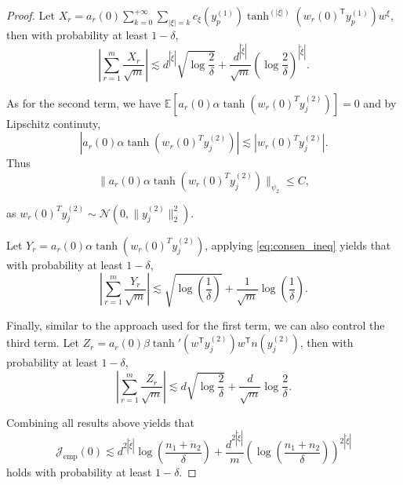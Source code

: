 \documentclass[10pt,a4paper]{amsart}
\newcommand{\T}{\mathsf{T}}
\begin{document}
\begin{proof}
   Let $X_r=a_r(0)\sum_{k=0}^{+\infty} \sum_{|\xi|=k} c_{\xi}(y_p^{(1)}) \tanh^{(|\xi|)}(w_r(0)^\T y_p^{(1)})w^{\xi}$, then with probability at least $1-\delta$,
	\begin{equation*}
        \left|\sum\limits_{r=1}^m \frac{X_r}{\sqrt{m}}\right|\lesssim d^{|\tilde{\xi}|}\sqrt{\log\frac{2}{\delta}} + \frac{d^{|\tilde{\xi}|}}{\sqrt{m}}\left(\log\frac{2}{\delta}\right)^{|\tilde{\xi}|}. 
    \end{equation*}

    As for the second term, we have
     $\mathbb{E}[a_r(0)\alpha\tanh(w_r(0)^T y_j^{(2)})]=0$ and by Lipschitz continuty,
	\begin{equation*}
          |a_r(0)\alpha\tanh(w_r(0)^T y_j^{(2)})|\lesssim |w_r(0)^T y_j^{(2)}|.
    \end{equation*}
	Thus
	\begin{equation*}
         \| a_r(0)\alpha\tanh(w_r(0)^T y_j^{(2)})\|_{\psi_2} \leq C,
    \end{equation*}
    
   as $w_r(0)^T y_j^{(2)}\sim \mathcal{N}(0,\|y_j^{(2)}\|_2^2)$.

	Let $Y_r=a_r(0)\alpha\tanh(w_r(0)^T y_j^{(2)})$, applying \cref{eq:consen_ineq} yields that with probability at least $1-\delta$,
	\begin{equation*}
        \left|\sum\limits_{r=1}^m \frac{Y_r}{\sqrt{m}}\right|\lesssim \sqrt{\log\left(\frac{1}{\delta}\right)} + \frac{1}{\sqrt{m}} \log\left(\frac{1}{\delta}\right).
    \end{equation*}
    
    Finally, similar to the approach used for the first term, we can also control the third term.
	Let $Z_r=a_r(0)\beta \tanh'(w^\T y_{j}^{(2)})w^\T n(y_{j}^{(2)})$, then with probability at least $1-\delta$,
	\begin{equation*}
        \left|\sum\limits_{r=1}^m \frac{Z_r}{\sqrt{m}}\right|\lesssim d\sqrt{\log\frac{2}{\delta}} + \frac{d}{\sqrt{m}}\log\frac{2}{\delta}. 
    \end{equation*}

    Combining all results above yields that
	\begin{equation*}
        \mathcal{J}_{\text{emp}}(0)\lesssim d^{2|\tilde{\xi}|}\log\left(\frac{n_1+n_2}{\delta}\right)+\frac{d^{2|\tilde{\xi}|}}{m} \left(\log\left(\frac{n_1+n_2}{\delta}\right)\right)^{2|\tilde{\xi}|}  
    \end{equation*}
   holds with probability at least $1-\delta$.
\end{proof}
\end{document}
